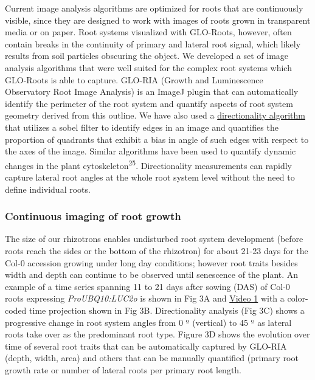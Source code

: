 \documentclass[]{article}
\begin{document}
Current image analysis algorithms are optimized for roots that are
continuously visible, since they are designed to work with images of
roots grown in transparent media or on paper. Root systems visualized
with GLO-Roots, however, often contain breaks in the continuity of
primary and lateral root signal, which likely results from soil
particles obscuring the object. We developed a set of image analysis
algorithms that were well suited for the complex root systems which
GLO-Roots is able to capture. GLO-RIA (Growth and Luminescence
Observatory Root Image Analysis) is an ImageJ plugin that can
automatically identify the perimeter of the root system and quantify
aspects of root system geometry derived from this outline. We have also
used a \href{http://fiji.sc/Directionality}{directionality algorithm}
that utilizes a sobel filter to identify edges in an image and
quantifies the proportion of quadrants that exhibit a bias in angle of
such edges with respect to the axes of the image. Similar algorithms
have been used to quantify dynamic changes in the plant
cytoskeleton\textsuperscript{25}. Directionality measurements can
rapidly capture lateral root angles at the whole root system level
without the need to define individual roots.

\subsubsection{Continuous imaging of root
growth}\label{continuous-imaging-of-root-growth}

The size of our rhizotrons enables undisturbed root system development
(before roots reach the sides or the bottom of the rhizotron) for about
21-23 days for the Col-0 accession growing under long day conditions;
however root traits besides width and depth can continue to be observed
until senescence of the plant. An example of a time series spanning 11
to 21 days after sowing (DAS) of Col-0 roots expressing
\emph{ProUBQ10:LUC2o} is shown in Fig 3A and
\href{https://www.dropbox.com/s/sxjc04o0yj2faif/Video_1.avi?dl=0}{Video
1} with a color-coded time projection shown in Fig 3B. Directionality
analysis (Fig 3C) shows a progressive change in root system angles from
0 º (vertical) to 45 º as lateral roots take over as the predominant
root type. Figure 3D shows the evolution over time of several root
traits that can be automatically captured by GLO-RIA (depth, width,
area) and others that can be manually quantified (primary root growth
rate or number of lateral roots per primary root length.
\end{document}
